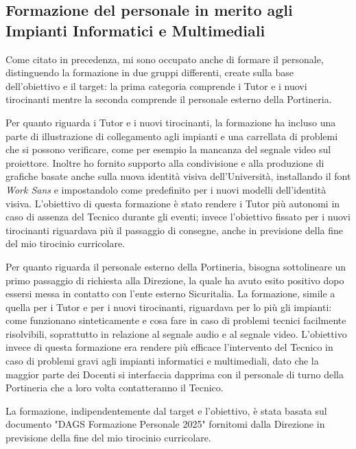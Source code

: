            \subsection{Formazione del personale in merito agli Impianti Informatici e Multimediali}
                    Come citato in precedenza, mi sono occupato anche di formare il personale, distinguendo la formazione in due gruppi differenti, create sulla base dell'obiettivo e il target: la prima categoria comprende i Tutor e i nuovi tirocinanti mentre la seconda comprende il personale esterno della Portineria. 
                \par
                    Per quanto riguarda i Tutor e i nuovi tirocinanti, la formazione ha incluso una parte di illustrazione di collegamento agli impianti e una carrellata di problemi che si possono verificare, come per esempio la mancanza del segnale video sul proiettore. Inoltre ho fornito supporto alla condivisione e alla produzione di grafiche basate anche sulla nuova identità visiva dell'Università, installando il font \textsl{Work Sans} e impostandolo come predefinito per i nuovi modelli dell'identità visiva. \newline
                    L'obiettivo di questa formazione è stato rendere i Tutor più autonomi in caso di assenza del Tecnico durante gli eventi; invece l'obiettivo fissato per i nuovi tirocinanti riguardava più il passaggio di consegne, anche in previsione della fine del mio tirocinio curricolare. 
                \par
                    Per quanto riguarda il personale esterno della Portineria, bisogna sottolineare un primo passaggio di richiesta alla Direzione, la quale ha avuto esito positivo dopo essersi messa in contatto con l'ente esterno Sicuritalia. La formazione, simile a quella per i Tutor e per i nuovi tirocinanti, riguardava per lo più gli impianti: come funzionano sinteticamente e cosa fare in caso di problemi tecnici facilmente risolvibili, soprattutto in relazione al segnale audio e al segnale video. \newline
                    L'obiettivo invece di questa formazione era rendere più efficace l'intervento del Tecnico in caso di problemi gravi agli impianti informatici e multimediali, dato che la maggior parte dei Docenti si interfaccia dapprima con il personale di turno della Portineria che a loro volta contatteranno il Tecnico.
                \par
                    La formazione, indipendentemente dal target e l'obiettivo, è stata basata sul documento "DAGS Formazione Personale 2025" fornitomi dalla Direzione in previsione della fine del mio tirocinio curricolare. 

